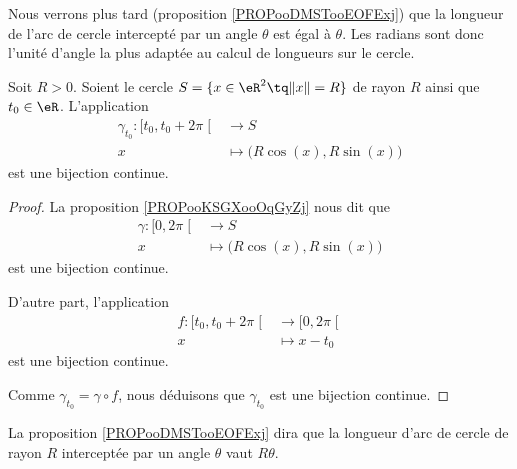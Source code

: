 Nous verrons plus tard (proposition \ref{PROPooDMSTooEOFExj}) que la longueur de l'arc de cercle intercepté par un angle \( \theta\) est égal à \( \theta\). Les radians sont donc l'unité d'angle la plus adaptée au calcul de longueurs sur le cercle.

\begin{lemma}       \label{LEMooXISFooRMWUEC}
	Soit \( R>0\). Soient le cercle \( S=\{ x\in \eR^2\tq \| x \|=R \}\) de rayon \( R\) ainsi que \( t_0\in \eR\). L'application
	\begin{equation}
		\begin{aligned}
			\gamma_{t_0}\colon \mathopen[ t_0 , t_0+2\pi \mathclose[ & \to S                                 \\
			x                                                        & \mapsto \big( R\cos(x),R\sin(x) \big)
		\end{aligned}
	\end{equation}
	est une bijection continue.
\end{lemma}

\begin{proof}
	La proposition \ref{PROPooKSGXooOqGyZj} nous dit que
	\begin{equation}
		\begin{aligned}
			\gamma\colon \mathopen[ 0 , 2\pi \mathclose[ & \to S                                 \\
			x                                            & \mapsto \big( R\cos(x),R\sin(x) \big)
		\end{aligned}
	\end{equation}
	est une bijection continue.

	D'autre part, l'application
	\begin{equation}
		\begin{aligned}
			f\colon \mathopen[ t_0 , t_0+2\pi \mathclose[ & \to \mathopen[ 0 , 2\pi \mathclose[ \\
			x                                             & \mapsto x-t_0
		\end{aligned}
	\end{equation}
	est une bijection continue.

	Comme \( \gamma_{t_0}=\gamma\circ f\), nous déduisons que \( \gamma_{t_0}\) est une bijection continue.
\end{proof}

\begin{normaltext}
	La proposition \ref{PROPooDMSTooEOFExj} dira que la longueur d'arc de cercle de rayon \( R\) interceptée par un angle \( \theta\) vaut \( R\theta\).
\end{normaltext}

